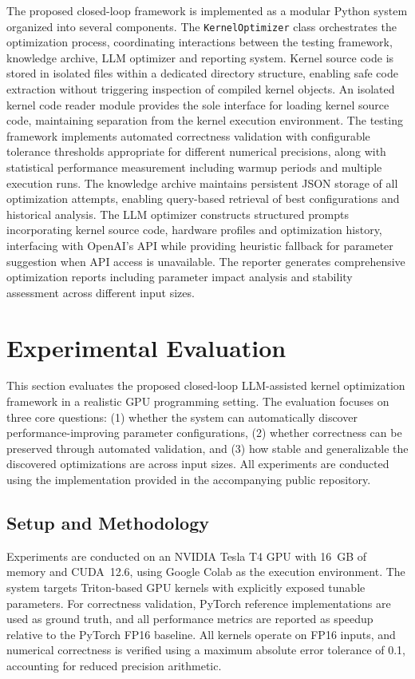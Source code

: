 \documentclass{article}
\begin{document}
The proposed closed-loop framework is implemented as a modular Python system organized into several components. The \texttt{KernelOptimizer} class orchestrates the optimization process, coordinating interactions between the testing framework, knowledge archive, LLM optimizer and reporting system. Kernel source code is stored in isolated files within a dedicated directory structure, enabling safe code extraction without triggering inspection of compiled kernel objects. An isolated kernel code reader module provides the sole interface for loading kernel source code, maintaining separation from the kernel execution environment. The testing framework implements automated correctness validation with configurable tolerance thresholds appropriate for different numerical precisions, along with statistical performance measurement including warmup periods and multiple execution runs. The knowledge archive maintains persistent JSON storage of all optimization attempts, enabling query-based retrieval of best configurations and historical analysis. The LLM optimizer constructs structured prompts incorporating kernel source code, hardware profiles and optimization history, interfacing with OpenAI's API while providing heuristic fallback for parameter suggestion when API access is unavailable. The reporter generates comprehensive optimization reports including parameter impact analysis and stability assessment across different input sizes.

\section{Experimental Evaluation}

This section evaluates the proposed closed-loop LLM-assisted kernel optimization framework in a realistic GPU programming setting. The evaluation focuses on three core questions: (1) whether the system can automatically discover performance-improving parameter configurations, (2) whether correctness can be preserved through automated validation, and (3) how stable and generalizable the discovered optimizations are across input sizes. All experiments are conducted using the implementation provided in the accompanying public repository.

\subsection{Setup and Methodology}

Experiments are conducted on an NVIDIA Tesla T4 GPU with 16~GB of memory and CUDA~12.6, using Google Colab as the execution environment. The system targets Triton-based GPU kernels with explicitly exposed tunable parameters. For correctness validation, PyTorch reference implementations are used as ground truth, and all performance metrics are reported as speedup relative to the PyTorch FP16 baseline. All kernels operate on FP16 inputs, and numerical correctness is verified using a maximum absolute error tolerance of 0.1, accounting for reduced precision arithmetic.
\end{document}
